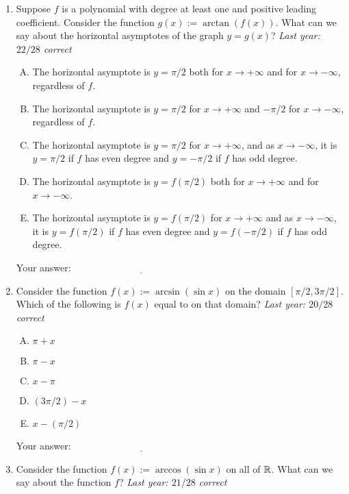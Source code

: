 \documentclass[10pt]{amsart}
\begin{document}
\begin{enumerate}
\item Suppose $f$ is a polynomial with degree at least one and
  positive leading coefficient. Consider the function $g(x) :=
  \arctan(f(x))$. What can we say about the horizontal asymptotes of
  the graph $y = g(x)$? {\em Last year: $22/28$ correct}

  \begin{enumerate}[(A)]
  \item The horizontal asymptote is $y = \pi/2$ both for $x \to +\infty$
    and for $x \to -\infty$, regardless of $f$.
  \item The horizontal asymptote is $y = \pi/2$ for $x \to +\infty$ and
    $-\pi/2$ for $x \to -\infty$, regardless of $f$.
  \item The horizontal asymptote is $y = \pi/2$ for $x \to +\infty$,
    and as $x \to -\infty$, it is $y = \pi/2$ if $f$ has even degree
    and $y = -\pi/2$ if $f$ has odd degree.
  \item The horizontal asymptote is $y = f(\pi/2)$ both for $x \to
    +\infty$ and for $x \to -\infty$.
  \item The horizontal asymptote is $y = f(\pi/2)$ for $x \to +\infty$
    and as $x \to -\infty$, it is $y = f(\pi/2)$ if $f$ has even
    degree and $y = f(-\pi/2)$ if $f$ has odd degree.
  \end{enumerate}

  \vspace{0.1in}
  Your answer: $\underline{\qquad\qquad\qquad\qquad\qquad\qquad\qquad}$
  \vspace{0.4in}

\item Consider the function $f(x) := \arcsin(\sin x)$ on the domain
  $[\pi/2,3\pi/2]$. Which of the following is $f(x)$ equal to on that
  domain? {\em Last year: $20/28$ correct}

  \begin{enumerate}[(A)]
  \item $\pi + x$
  \item $\pi - x$
  \item $x - \pi$
  \item $(3\pi/2) - x$
  \item $x - (\pi/2)$
  \end{enumerate}

  \vspace{0.1in}
  Your answer: $\underline{\qquad\qquad\qquad\qquad\qquad\qquad\qquad}$
  \vspace{0.4in}

\item Consider the function $f(x) := \arccos(\sin x)$ on all of
  $\mathbb{R}$. What can we say about the function $f$? {\em Last year:
  $21/28$ correct}


\end{enumerate}
\end{document}
